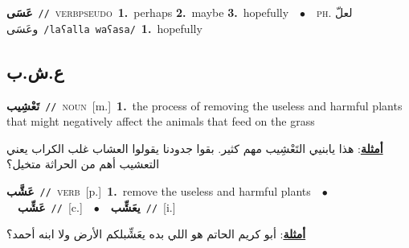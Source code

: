 \documentclass[10pt,a4paper,twoside]{article} %
\begin{document}
\begin{multicols}{2}
{\setlength\topsep{0pt}\textbf{\foreignlanguage{arabic}{عَسَى}}\ {\color{gray}\texttt{//}\color{black}}\ \textsc{verb\textunderscore pseudo}\ \textbf{1.}~perhaps  \textbf{2.}~maybe  \textbf{3.}~hopefully\ \ $\bullet$\ \ \textsc{ph.} \color{gray} \foreignlanguage{arabic}{لعلّ وعَسَى}\color{black}\ {\color{gray}\texttt{/{\sffamily laʕalla waʕasa}/}\color{black}}\ \textbf{1.}~hopefully\ } \vspace{2mm}

\vspace{-3mm}
\subsection*{\color{blue}\foreignlanguage{arabic}{ع.ش.ب}\color{blue}{}} 

{\setlength\topsep{0pt}\textbf{\foreignlanguage{arabic}{تَعْشِيب}}\ {\color{gray}\texttt{//}\color{black}}\ \textsc{noun}\ [m.]\ \textbf{1.}~the process of removing the useless and harmful plants that might negatively affect the animals that feed on the grass\  \begin{flushright}\color{gray}\foreignlanguage{arabic}{\textbf{\underline{\foreignlanguage{arabic}{أمثلة}}}: هذا يابنيي التَعْشِيب مهم كثير. بقوا جدودنا يقولوا العشاب غلب الكراب يعني التعشيب أهم من الحراثة متخيل؟}\end{flushright}\color{black}} \vspace{2mm}

{\setlength\topsep{0pt}\textbf{\foreignlanguage{arabic}{عَشَّب}}\ {\color{gray}\texttt{//}\color{black}}\ \textsc{verb}\ [p.]\ \textbf{1.}~remove the useless and harmful plants\ \ $\bullet$\ \ \setlength\topsep{0pt}\textbf{\foreignlanguage{arabic}{عَشِّب}}\ {\color{gray}\texttt{//}\color{black}}\ [c.]\ \ $\bullet$\ \ \setlength\topsep{0pt}\textbf{\foreignlanguage{arabic}{يعَشِّب}}\ {\color{gray}\texttt{//}\color{black}}\ [i.]\  \begin{flushright}\color{gray}\foreignlanguage{arabic}{\textbf{\underline{\foreignlanguage{arabic}{أمثلة}}}: أبو كريم الحاتم هو اللي بده يعَشِّبلكم الأرض ولا ابنه أحمد؟}\end{flushright}\color{black}} \vspace{2mm}


\end{multicols}
\end{document}
